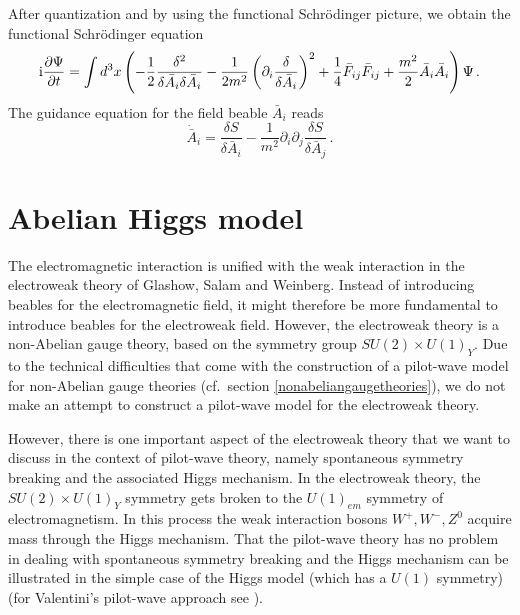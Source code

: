 \documentclass[12pt]{article}
\def\ii{\textrm i}
\begin{document}
After quantization and by using the functional Schr{\"o}\-ding\-er picture, we obtain the functional Schr{\"o}\-ding\-er equation
\begin{equation}
\ii\frac{\partial \Psi}{\partial t}= \int d^3 x \left( -\frac{1}{2}\frac{\delta^2}{\delta  {\bar A}_{i}\delta  {\bar A}_{i}}-  \frac{1}{2m^2}\left( \partial_i  \frac{\delta}{\delta  {\bar A}_{i} } \right)^2  + \frac{1}{4}{\bar F}_{ij}{\bar F}_{ij} +  \frac{m^2}{2}  {\bar A}_i {\bar A}_i  \right)\Psi\,.
\label{115.004}
\end{equation}
The guidance equation for the field beable ${\bar A}_{i}$ reads
\begin{equation}
{\dot {\bar A}}_{i}  =  \frac{\delta S}{\delta {\bar A}_i } - \frac{1}{m^2} \partial_i\partial_j \frac{\delta S}{\delta {\bar A}_j }\,.
\label{115.006}
\end{equation}


\section{Abelian Higgs model}
The electromagnetic interaction is unified with the weak interaction in the electroweak theory of Glashow, Salam and Weinberg. Instead of introducing beables for the electromagnetic field, it might therefore be more fundamental to introduce beables for the electroweak field. However, the electroweak theory is a non-Abelian gauge theory, based on the symmetry group $SU(2) \times U(1)_Y$. Due to the technical difficulties that come with the construction of a pilot-wave model for non-Abelian gauge theories (cf.\ section \ref{nonabeliangaugetheories}), we do not make an attempt to construct a pilot-wave model for the electroweak theory.

However, there is one important aspect of the electroweak theory that we want to discuss in the context of pilot-wave theory, namely spontaneous symmetry breaking and the associated Higgs mechanism. In the electroweak theory, the $SU(2) \times U(1)_Y$ symmetry gets broken to the $U(1)_{em}$ symmetry of electromagnetism. In this process the weak interaction bosons $W^+,W^-,Z^0$ acquire mass through the Higgs mechanism. That the pilot-wave theory has no problem in dealing with spontaneous symmetry breaking and the Higgs mechanism can be illustrated in the simple case of the Higgs model (which has a $U(1)$ symmetry) (for Valentini's pilot-wave approach see \cite{valentini09}).
\end{document}

